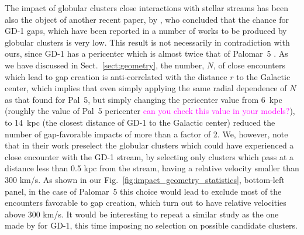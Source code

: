 \documentclass[draft]{aa}
\newcommand{\paola}[1]{\textcolor{magenta}{{#1}}}
\begin{document}
  The impact of globular clusters close interactions with stellar streams has been also the object of another recent paper, by \citet{2022ApJ...941..129D}, who concluded that the chance for GD-1 gaps, which have been reported in a number of works \citep[see, for example, ][]{} to be produced by globular clusters is very low. This result is not necessarily in contradiction with ours, since GD-1 has a pericenter which is almost twice that of Palomar~5 \citep[see, for example][]{2019MNRAS.486.2995M}. As we have discussed in Sect.~\ref{sect:geometry}, the number, $N$, of close encounters which lead to gap creation is anti-correlated with the distance $r$ to the Galactic center, which implies that even simply applying the same radial dependence of $N$ as that found for Pal~5, but simply changing the pericenter value from $6$~kpc (roughly the value of Pal~5 pericenter \paola{can you check this value in your models?}), to 14~kpc (the closest distance of GD-1 to the Galactic center) reduced the number of gap-favorable impacts of more than a factor of 2. We, however, note that in their work \citet{2022ApJ...941..129D} preselect the  globular clusters which could have experienced a close encounter with the GD-1 stream, by selecting only clusters which pass at a distance less than 0.5 kpc from the stream, having a relative velocity smaller than  300 km/s. As shown in our Fig.~\ref{fig:impact_geometry_statistics}, bottom-left panel, in the case of Palomar~5 this choice would lead to exclude most of the encounters favorable to gap creation, which turn out to have relative velocities above 300 km/s. It would be interesting to repeat a similar study as the one made by  \citet{2022ApJ...941..129D} for GD-1, this time imposing no selection on possible candidate clusters.\\
  
\end{document}
